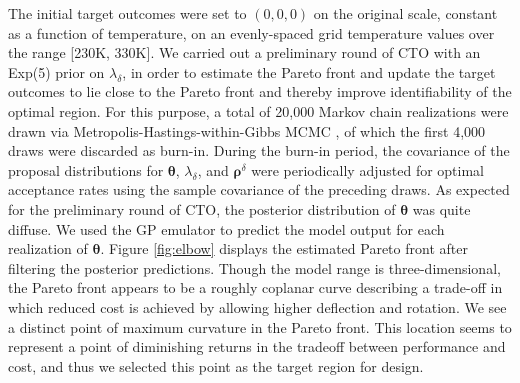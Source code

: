 \documentclass[12pt]{article}
\begin{document}
The initial target outcomes were set to $(0,0,0)$ on the original scale, constant as a function of temperature, on an evenly-spaced grid temperature values over the range [230K, 330K].
%
We carried out a preliminary round of CTO with an Exp(5) prior on $\lambda_\delta$, in order to estimate the Pareto front and update the target outcomes to lie close to the Pareto front and thereby improve identifiability of the optimal region.
%
For this purpose, a total of 20,000 Markov chain realizations were drawn via Metropolis-Hastings-within-Gibbs MCMC \citep{Metropolis1953, Hastings1970, Geman1984}, of which the first 4,000 draws were discarded as burn-in. 
%
During the burn-in period, the covariance of the proposal distributions for $\boldsymbol \theta$, $\lambda_\delta$, and $\boldsymbol\rho^\delta$ were periodically adjusted for optimal acceptance rates \citep[of around $23\%$; see][]{Roberts1997} using the sample covariance of the preceding draws. %
%
%
%
As expected for the preliminary round of CTO, the posterior distribution of $\boldsymbol\theta$ was quite diffuse.
%
We used the GP emulator to predict the model output for each realization of $\boldsymbol \theta$.
%
Figure \ref{fig:elbow} displays the estimated Pareto front after filtering the posterior predictions.
%
Though the model range is three-dimensional, the Pareto front appears to be a roughly coplanar curve describing a trade-off in which reduced cost is achieved by allowing higher deflection and rotation.
%
We see a distinct point of maximum curvature in the Pareto front. 
%
This location seems to represent a point of diminishing returns in the tradeoff between performance and cost, and thus we selected this point as the target region for design.
%
\end{document}
